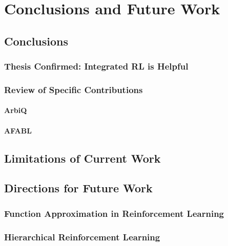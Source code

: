 \chapter{Conclusions and Future Work}

\section{Conclusions}

\subsection{Thesis Confirmed: Integrated RL is Helpful}

\subsection{Review of Specific Contributions}

\subsubsection{ArbiQ}

\subsubsection{AFABL}

\section{Limitations of Current Work}

\section{Directions for Future Work}

\subsection{Function Approximation in Reinforcement Learning}

\subsection{Hierarchical Reinforcement Learning}

